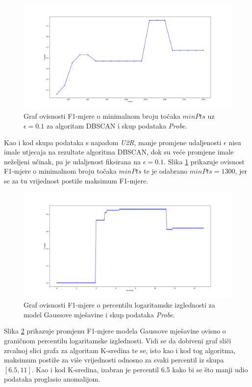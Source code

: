 \documentclass[utf8, diplomski, numeric]{fer}
\begin{document}
\begin{figure}[h!]
\includegraphics[width=1\textwidth]{images/probe-dbscan-f1.png}
\centering
\caption{Graf ovisnosti F1-mjere o minimalnom broju točaka $minPts$ uz $\epsilon = 0.1$ za algoritam DBSCAN i skup podataka \textit{Probe}.}
\label{fig:probe-dbscan}
\end{figure}

Kao i kod skupa podataka s napadom \textit{U2R}, manje promjene udaljenosti $\epsilon$ nisu imale utjecaja na rezultate algoritma DBSCAN, dok su veće promjene imale neželjeni učinak, pa je udaljenost fiksirana na $\epsilon = 0.1$. Slika \ref{fig:probe-dbscan} prikazuje ovisnost F1-mjere o minimalnom broju točaka $minPts$ te je odabrano $minPts = 1300$, jer se za tu vrijednost postiže maksimum F1-mjere.

\begin{figure}[h!]
\includegraphics[width=1\textwidth]{images/probe-gauss-f1.png}
\centering
\caption{Graf ovisnosti F1-mjere o percentilu logaritamske izglednosti za model Gaussove mješavine i skup podataka \textit{Probe}.}
\label{fig:probe-gauss}
\end{figure}

Slika \ref{fig:probe-gauss} prikazuje promjenu F1-mjere modela Gaussove mješavine ovisno o graničnom percentilu logaritamske izglednosti. Vidi se da dobiveni graf sliči zrcalnoj slici grafa za algoritam K-sredina te se, isto kao i kod tog algoritma, maksimum postiže za više vrijednosti odnosno za svaki percentil iz skupa $[6.5, 11]$. Kao i kod K-sredina, izabran je percentil 6.5 kako bi se što manji udio podataka proglasio anomalijom.
\end{document}
